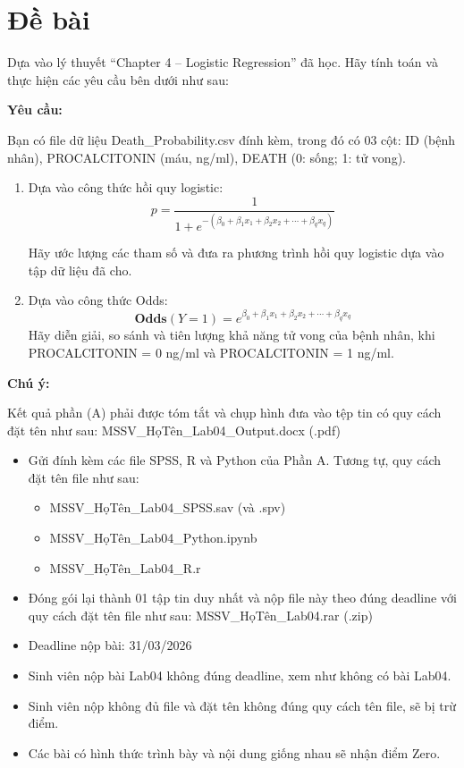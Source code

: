 \newpage
\section*{Đề bài}

Dựa vào lý thuyết “Chapter 4 – Logistic Regression” đã học. Hãy tính toán và thực hiện các yêu cầu bên dưới như sau:

\textbf{Yêu cầu:}

Bạn có file dữ liệu Death\_Probability.csv đính kèm, trong đó có 03 cột: ID (bệnh nhân), PROCALCITONIN (máu, ng/ml), DEATH (0: sống; 1: tử vong).

\begin{enumerate}
\item Dựa vào công thức hồi quy logistic:
\[
p = \dfrac{1}{1 + e^{-(\beta_0 + \beta_1 x_1 + \beta_2 x_2 + \cdots + \beta_q x_q)}}
\]

Hãy ước lượng các tham số và đưa ra phương trình hồi quy logistic dựa vào tập dữ liệu đã cho.

\item Dựa vào công thức Odds:
\[
\textbf{Odds}(Y=1) = e^{\beta_0 + \beta_1 x_1 + \beta_2 x_2 + \cdots + \beta_q x_q}
\]
Hãy diễn giải, so sánh và tiên lượng khả năng tử vong của bệnh nhân, khi PROCALCITONIN = 0 ng/ml và PROCALCITONIN = 1 ng/ml.

\end{enumerate}

\textbf{Chú ý:}

Kết quả phần (A) phải được tóm tắt và chụp hình đưa vào tệp tin có quy cách đặt tên như sau: MSSV\_HọTên\_Lab04\_Output.docx (.pdf)

\begin{itemize}

\item Gửi đính kèm các file SPSS, R và Python của Phần A. Tương tự, quy cách đặt tên file như sau:
\begin{itemize}
\item MSSV\_HọTên\_Lab04\_SPSS.sav (và .spv)
\item MSSV\_HọTên\_Lab04\_Python.ipynb
\item MSSV\_HọTên\_Lab04\_R.r
\end{itemize}

\item Đóng gói lại thành 01 tập tin duy nhất và nộp file này theo đúng deadline với quy cách đặt tên file như sau: MSSV\_HọTên\_Lab04.rar (.zip)

\item Deadline nộp bài: 31/03/2026

\item Sinh viên nộp bài Lab04 không đúng deadline, xem như không có bài Lab04.

\item Sinh viên nộp không đủ file và đặt tên không đúng quy cách tên file, sẽ bị trừ điểm.

\item Các bài có hình thức trình bày và nội dung giống nhau sẽ nhận điểm Zero.

\end{itemize}